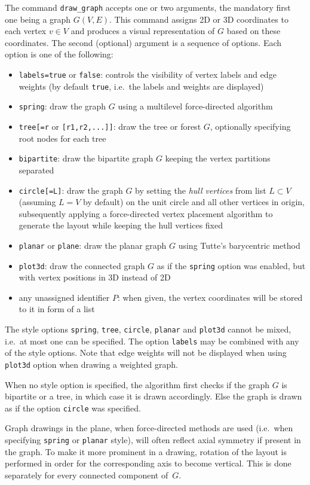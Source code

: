 \documentclass[a4paper,11pt]{article}
\begin{document}
The command {\tt draw\_graph} accepts one or two arguments, the mandatory first one being a graph $ G(V,E) $. This command assigns 2D or 3D coordinates to each vertex $ v\in V $ and produces a visual representation of $ G $ based on these coordinates. The second (optional) argument is a sequence of options. Each option is one of the following:
\begin{itemize}
  \item {\tt labels=true} or {\tt false}: controls the visibility of vertex labels and edge weights (by default {\tt true}, i.e.~the labels and weights are displayed)
  \item {\tt spring}: draw the graph $ G $ using a multilevel force-directed algorithm
  \item {\tt tree[=r} or {\tt [r1,r2,...]]}: draw the tree or forest $ G $, optionally specifying root nodes for each tree
  \item {\tt bipartite}: draw the bipartite graph $ G $ keeping the vertex partitions separated
  \item {\tt circle[=L]}: draw the graph $ G $ by setting the {\it hull vertices} from list $ L\subset V $ (assuming $ L=V $ by default) on the unit circle and all other vertices in origin, subsequently applying a force-directed vertex placement algorithm to generate the layout while keeping the hull vertices fixed
  \item {\tt planar} or {\tt plane}: draw the planar graph $ G $ using Tutte's barycentric method
  \item {\tt plot3d}: draw the connected graph $ G $ as if the {\tt spring} option was enabled, but with vertex positions in 3D instead of 2D
  \item any unassigned identifier $ P $: when given, the vertex coordinates will be stored to it in form of a list
\end{itemize}
The style options {\tt spring}, {\tt tree}, {\tt circle}, {\tt planar} and {\tt plot3d} cannot be mixed, i.e.~at most one can be specified. The option {\tt labels} may be combined with any of the style options. Note that edge weights will not be displayed when using {\tt plot3d} option when drawing a weighted graph.

When no style option is specified, the algorithm first checks if the graph $ G $ is bipartite or a tree, in which case it is drawn accordingly. Else the graph is drawn as if the option {\tt circle} was specified.

Graph drawings in the plane, when force-directed methods are used (i.e.~when specifying {\tt spring} or {\tt planar} style), will often reflect axial symmetry if present in the graph. To make it more prominent in a drawing, rotation of the layout is performed in order for the corresponding axis to become vertical. This is done separately for every connected component of~$ G $.
\end{document}
